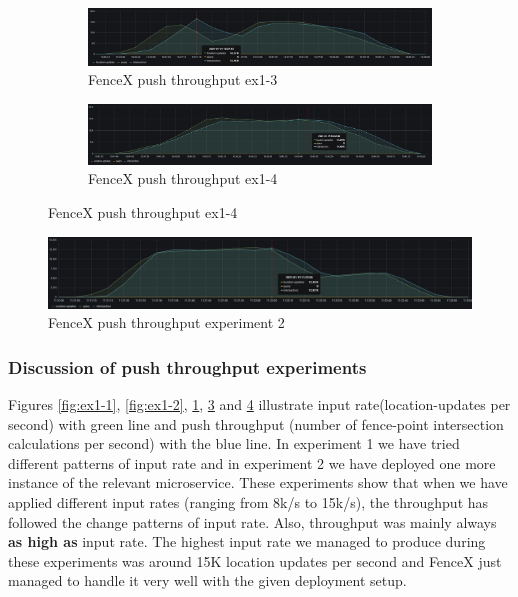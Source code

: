 \documentclass[a4]{report}
\begin{document}
    \begin{figure}
        \centering
        \begin{subfigure}[b]{\textwidth}
            \centering
            \caption{FenceX push throughput ex1-3}
            \label{fig:ex1-3}
            \includegraphics[width=\textwidth, height=0.35\textheight, scale=2]{images/evaluation/ex1-benchmarking(22,9).png}
        \end{subfigure}

        \begin{subfigure}[b]{\textwidth}
            \centering
            \caption{FenceX push throughput ex1-4}
            \label{fig:ex1-4}
            \includegraphics[width=\textwidth, height=0.35\textheight, scale=2]{images/evaluation/ex1-benchmarking(23,10).png}
        \end{subfigure}
    \end{figure}

    \begin{figure}
        \caption{FenceX push throughput experiment 2}
        \label{fig:ex2}
        \includegraphics[width=\textwidth, height=0.35\textheight]{images/evaluation/ex2-benchmarking(24,10).png}
    \end{figure}

    \clearpage

    \subsubsection{Discussion of push throughput experiments}
    Figures \ref{fig:ex1-1}, \ref{fig:ex1-2}, \ref{fig:ex1-3}, \ref{fig:ex1-4} and \ref{fig:ex2} illustrate input
    rate(location-updates per second) with green line and push throughput (number of fence-point intersection
    calculations per second) with the blue line.
    In experiment 1 we have tried different patterns of input rate and in experiment 2 we have deployed one more instance of the relevant microservice.
    These experiments show that when we have applied different input rates (ranging from 8k/s to 15k/s), the throughput
    has followed the change patterns of input rate.
    Also, throughput was mainly always \textbf{as high as} input rate.
    The highest input rate we managed to produce during these experiments was around 15K location updates per second and FenceX just managed to handle it very well with the given deployment setup.
\end{document}
